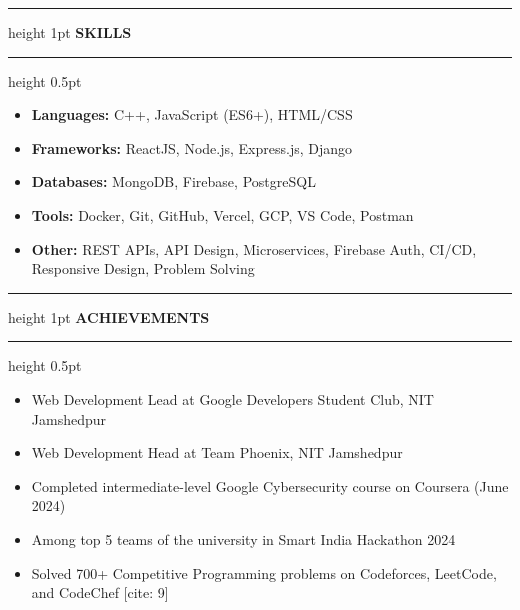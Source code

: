 \documentclass[10pt, letterpaper]{article}
\newcommand{\sectiontitle}[1]{\vspace{6pt}\hrule height 1pt \vspace{3pt}\textbf{\large #1}\vspace{3pt}\hrule height 0.5pt \vspace{6pt}}
\begin{document}
\sectiontitle{SKILLS}
\begin{itemize}
    \item \textbf{Languages:} C++, JavaScript (ES6+), HTML/CSS
    \item \textbf{Frameworks:} ReactJS, Node.js, Express.js, Django
    \item \textbf{Databases:} MongoDB, Firebase, PostgreSQL
    \item \textbf{Tools:} Docker, Git, GitHub, Vercel, GCP, VS Code, Postman
    \item \textbf{Other:} REST APIs, API Design, Microservices, Firebase Auth, CI/CD, Responsive Design, Problem Solving
\end{itemize}

\sectiontitle{ACHIEVEMENTS}
\begin{itemize}
    \item Web Development Lead at Google Developers Student Club, NIT Jamshedpur
    \item Web Development Head at Team Phoenix, NIT Jamshedpur
    \item Completed intermediate-level Google Cybersecurity course on Coursera (June 2024)
    \item Among top 5 teams of the university in Smart India Hackathon 2024
    \item Solved 700+ Competitive Programming problems on Codeforces, LeetCode, and CodeChef [cite: 9]
\end{itemize}
\end{document}
